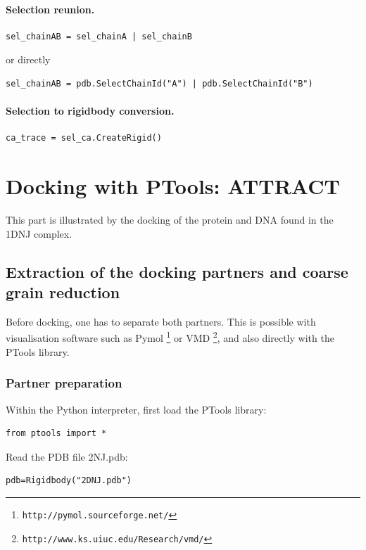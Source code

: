 \documentclass[12pt,a4paper]{article}
\begin{document}
\paragraph{Selection reunion.}
\begin{verbatim}
sel_chainAB = sel_chainA | sel_chainB
\end{verbatim}
or directly
\begin{verbatim}
sel_chainAB = pdb.SelectChainId("A") | pdb.SelectChainId("B")
\end{verbatim}


\paragraph{Selection to rigidbody conversion.}
\begin{verbatim}
ca_trace = sel_ca.CreateRigid()
\end{verbatim}



\section{Docking with PTools: ATTRACT}

This part is illustrated by the docking of the protein and DNA found in the 1DNJ complex.

\subsection{Extraction of the docking partners and coarse grain reduction}

Before docking, one has to separate both partners. This is possible with visualisation
software such as Pymol \footnote{\tt http://pymol.sourceforge.net/} or VMD \footnote{\tt http://www.ks.uiuc.edu/Research/vmd/}, and also directly with the PTools library.

\subsubsection{Partner preparation}

Within the Python interpreter, first load the PTools library:
\begin{verbatim}
from ptools import *
\end{verbatim}

Read the PDB file 2NJ.pdb:
\begin{verbatim}
pdb=Rigidbody("2DNJ.pdb")
\end{verbatim}
\end{document}
